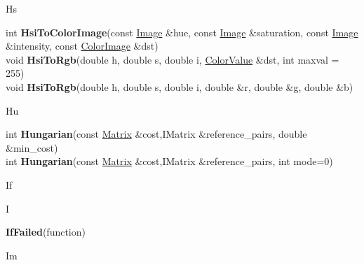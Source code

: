 \documentclass[10pt,titlepage]{article}
\def\functionlistentry#1#2#3#4#5#6{\noindent #1 {\bf #2}(#3) \dotfill #6\\}
\def\letterref#1{}
\def\letterlabel#1{\vspace{0.5cm}\centerline{\Large #1}}
\def\letterlabelend#1{}
\begin{document}
{{\letterlabel{Hs}
\letterref{A}
\letterref{B}
\letterref{C}
\letterref{D}
\letterref{E}
\letterref{F}
\letterref{G}
\letterref{H}
\letterref{I}
\letterref{K}
\letterref{L}
\letterref{M}
\letterref{N}
\letterref{O}
\letterref{P}
\letterref{Q}
\letterref{R}
\letterref{S}
\letterref{T}
\letterref{U}
\letterref{V}
\letterref{W}
\letterref{X}
\letterref{Y}
\letterref{Z}

\letterref{Ha}
\letterref{He}
\letterref{Hi}
\letterref{Hs}
\letterref{Hu}
\letterlabelend{Hs}
\functionlistentry{int}{HsiToColorImage}{const \hyperlink{Image}{Image} \&hue, const \hyperlink{Image}{Image} \&saturation, const \hyperlink{Image}{Image} \&intensity, const \hyperlink{ColorImage}{ColorImage} \&dst}{1108}{processing}{}
\functionlistentry{void}{HsiToRgb}{double h, double s, double i, \hyperlink{ColorValue}{ColorValue} \&dst, int maxval = 255}{303}{datastructures}{}
\functionlistentry{void}{HsiToRgb}{double h, double s, double i, double \&r, double \&g, double \&b}{307}{datastructures}{}

\letterlabel{Hu}
\letterref{A}
\letterref{B}
\letterref{C}
\letterref{D}
\letterref{E}
\letterref{F}
\letterref{G}
\letterref{H}
\letterref{I}
\letterref{K}
\letterref{L}
\letterref{M}
\letterref{N}
\letterref{O}
\letterref{P}
\letterref{Q}
\letterref{R}
\letterref{S}
\letterref{T}
\letterref{U}
\letterref{V}
\letterref{W}
\letterref{X}
\letterref{Y}
\letterref{Z}

\letterref{Ha}
\letterref{He}
\letterref{Hi}
\letterref{Hs}
\letterref{Hu}
\letterlabelend{Hu}
\functionlistentry{int}{Hungarian}{const \hyperlink{Matrix}{Matrix} \&cost,IMatrix \&reference\_pairs, double \&min\_cost}{1263}{registration}{}
\functionlistentry{int}{Hungarian}{const \hyperlink{Matrix}{Matrix} \&cost,IMatrix \&reference\_pairs, int mode=0}{1264}{registration}{}

\letterlabel{If}
\letterlabel{I}
\letterref{A}
\letterref{B}
\letterref{C}
\letterref{D}
\letterref{E}
\letterref{F}
\letterref{G}
\letterref{H}
\letterref{I}
\letterref{K}
\letterref{L}
\letterref{M}
\letterref{N}
\letterref{O}
\letterref{P}
\letterref{Q}
\letterref{R}
\letterref{S}
\letterref{T}
\letterref{U}
\letterref{V}
\letterref{W}
\letterref{X}
\letterref{Y}
\letterref{Z}

\letterref{If}
\letterref{Im}
\letterref{In}
\letterref{Is}
\letterlabelend{If}
\functionlistentry{}{IfFailed}{function}{1553}{errorHandling}{}

\letterlabel{Im}
\letterref{A}
\letterref{B}
\letterref{C}
\letterref{D}
\letterref{E}
\letterref{F}
\letterref{G}
\letterref{H}
\letterref{I}
\letterref{K}
\letterref{L}
\letterref{M}
\letterref{N}
\letterref{O}
\letterref{P}
\letterref{Q}
\letterref{R}
\letterref{S}
\letterref{T}
\letterref{U}
\letterref{V}
\letterref{W}
\letterref{X}
\letterref{Y}
\letterref{Z}

}}
\end{document}
